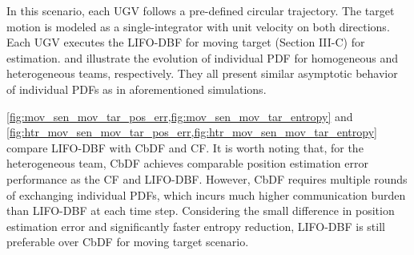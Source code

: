 \documentclass[journal]{IEEEtranTIE}
\theoremstyle{remark}
\begin{document}
In this scenario, each UGV follows a pre-defined circular trajectory. 
The target motion is modeled as a single-integrator with unit velocity on both directions.
Each UGV executes the LIFO-DBF for moving target (Section III-C) for estimation.
 and  illustrate the evolution of individual PDF for homogeneous and heterogeneous teams, respectively.
They all present similar asymptotic behavior of individual PDFs as in aforementioned simulations.

\cref{fig:mov_sen_mov_tar_pos_err,fig:mov_sen_mov_tar_entropy} and \cref{fig:htr_mov_sen_mov_tar_pos_err,fig:htr_mov_sen_mov_tar_entropy} compare LIFO-DBF with CbDF and CF.
It is worth noting that, for the heterogeneous team, CbDF achieves comparable position estimation error performance as the CF and LIFO-DBF.
However, CbDF requires multiple rounds of exchanging individual PDFs, which incurs much higher communication burden than LIFO-DBF at each time step.
Considering the small difference in position estimation error and significantly faster entropy reduction, LIFO-DBF is still preferable over CbDF for moving target scenario.

\newpage
\end{document}
